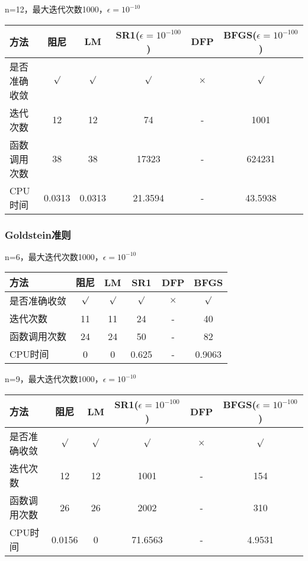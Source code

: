 \documentclass[11pt, a4paper]{article}
\begin{document}
\vspace{20pt}
n=12，最大迭代次数1000，$\epsilon=10^{-10}$

\vspace{10pt}
\begin{tabular}{|l|c|c|c|c|c|}
	\hline
	方法 & 阻尼 & LM & SR1($\epsilon=10^{-100}$) & DFP & BFGS($\epsilon=10^{-100}$) \\\hline
	是否准确收敛 & $\surd$ & $\surd$ & $\surd$ & $\times$ & $\surd$ \\\hline
	迭代次数 & 12 & 12 & 74 & - & 1001 \\\hline
	函数调用次数 & 38 & 38 & 17323 & - & 624231 \\\hline
	CPU时间 & 0.0313 & 0.0313 & 21.3594 & - & 43.5938\\\hline
\end{tabular}

\subsubsection{Goldstein准则}

n=6，最大迭代次数1000，$\epsilon=10^{-10}$

\vspace{10pt}
\begin{tabular}{|l|c|c|c|c|c|}
	\hline
	方法 & 阻尼 & LM & SR1 & DFP & BFGS \\\hline
	是否准确收敛 & $\surd$ & $\surd$ & $\surd$ & $\times$ & $\surd$ \\\hline
	迭代次数 & 11 & 11 & 24 & - & 40 \\\hline
	函数调用次数 & 24 & 24 & 50 & - & 82 \\\hline
	CPU时间 & 0 & 0 & 0.625 & - & 0.9063\\\hline
\end{tabular}

\vspace{20pt}
n=9，最大迭代次数1000，$\epsilon=10^{-10}$

\vspace{10pt}
\begin{tabular}{|l|c|c|c|c|c|}
	\hline
	方法 & 阻尼 & LM & SR1($\epsilon=10^{-100}$) & DFP & BFGS($\epsilon=10^{-100}$) \\\hline
	是否准确收敛 & $\surd$ & $\surd$ & $\surd$ & $\times$ & $\surd$ \\\hline
	迭代次数 & 12 & 12 & 1001 & - & 154 \\\hline
	函数调用次数 & 26 & 26 & 2002 & - & 310 \\\hline
	CPU时间 & 0.0156 & 0 & 71.6563 & - & 4.9531\\\hline
\end{tabular}
\end{document}
